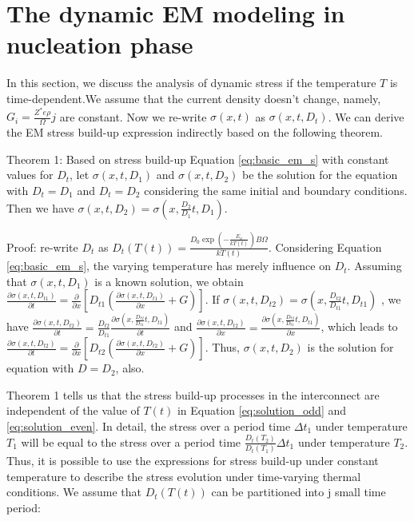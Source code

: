 \section{The dynamic EM modeling in nucleation phase}
\label{sec:dynamic_modeling}
In this section, we discuss the analysis of dynamic stress if the temperature $T$ is time-dependent.We assume that the current density doesn't change, namely, $G_i=\frac{Z^*e\rho}{\Omega}j$ are constant. Now we re-write $\sigma(x,t)$ as $\sigma(x,t,D_{t})$. We can derive the EM stress build-up expression indirectly based on the following theorem.

Theorem 1: Based on stress build-up Equation \eqref{eq:basic_em_s} with constant values for $D_t$, let $\sigma(x,t,D_{1})$ and $\sigma(x,t,D_{2})$ be the solution for the equation with $D_t=D_{1}$ and $D_t=D_{2}$ considering the same initial and boundary conditions. Then we have $\sigma(x,t,D_{2})=\sigma(x,\frac{D_{2}}{D_{1}}t,D_{1})$.

Proof: re-write $D_t$ as $D_t(T(t))=\frac{D_0\exp(-\frac{E_a}{kT(t)})B\Omega}{kT(t)}$. Considering Equation \eqref{eq:basic_em_s}, the varying temperature has merely influence on $D_t$. Assuming that $\sigma(x,t,D_{1})$ is a known solution, we obtain $\frac{\partial \sigma(x,t,D_{t1})}{\partial t}=\frac{\partial }{\partial x}[D_{t1}(\frac{\partial \sigma(x,t,D_{t1})}{\partial x}+G)]$. If $\sigma(x,t,D_{t2})=\sigma(x,\frac{D_{t2}}{D_{t1}}t,D_{t1})$ , we have $\frac{\partial \sigma(x,t,D_{t2})}{\partial t}=\frac{D_{t2}}{D_{t1}}\frac{\partial \sigma(x,\frac{D_{t2}}{D_{t1}}t,D_{t1})}{\partial t}$ and $\frac{\partial \sigma(x,t,D_{t2})}{\partial x}=\frac{\partial \sigma(x,\frac{D_{t2}}{D_{t1}}t,D_{t1})}{\partial x}$, which leads to $\frac{\partial \sigma(x,t,D_{t2})}{\partial t}=\frac{\partial }{\partial x}[D_{t2}(\frac{\partial \sigma(x,t,D_{t2})}{\partial x}+G)]$. Thus, $\sigma(x,t,D_{2})$ is the solution for equation with $D=D_{2}$, also.

Theorem 1 tells us that the stress build-up processes in the interconnect are independent of the value of $T(t)$ in Equation \eqref{eq:solution_odd} and \eqref{eq:solution_even}. In detail, the stress over a period time $\Delta t_1$ under temperature $T_1$ will be equal to the stress over a period time $\frac{D_t(T_2)}{D_t(T_1)}\Delta t_1$ under temperature $T_2$. Thus, it is possible to use the expressions for stress build-up under constant temperature to describe the stress evolution under time-varying thermal conditions. We assume that $D_t(T(t))$ can be partitioned into j small time period:

